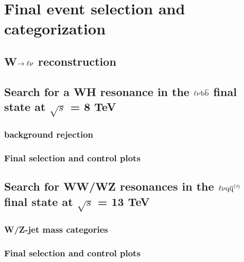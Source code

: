 \chapter{Final event selection and categorization}

\section{W$\rightarrow\ell\nu$ reconstruction}

\section{Search for a WH resonance in the $\ell\nu{\mathrm{b}\overline{\mathrm{b}}}$ final state at $\sqrt{s}$ = 8 TeV}
\subsection{\ttbar background rejection}
\subsection{Final selection and control plots}

\section{Search for WW/WZ resonances in the $\ell\nu\mathrm{q}\overline{\mathrm{q}}^({}'^){}$ final state at $\sqrt{s}$ = 13 TeV}
\subsection{W/Z-jet mass categories}
\subsection{Final selection and control plots}